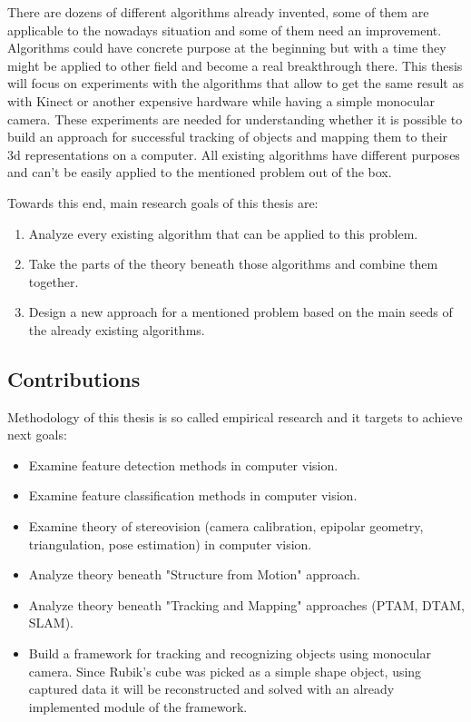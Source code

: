 \documentclass[../main]{subfiles}
\begin{document}
There are dozens of different algorithms already invented, some of them are applicable to the nowadays situation and some of them need an improvement. Algorithms could have concrete purpose at the beginning but with a time they might be applied to other field and become a real breakthrough there. This thesis will focus on experiments with the algorithms that allow to get the same result as with Kinect or another expensive hardware while having a simple monocular camera. These experiments are needed for understanding whether it is possible to build an approach for successful tracking of objects and mapping them to their 3d representations on a computer. All existing algorithms have different purposes and can't be easily applied to the mentioned problem out of the box.

Towards this end, main research goals of this thesis are:
\begin{enumerate}
\item  Analyze every existing algorithm that can be applied to this problem.
\item  Take the parts of the theory beneath those algorithms and combine them together.
\item  Design a new approach for a mentioned problem based on the main seeds of the already existing algorithms. 
\end{enumerate}

\subsection{Contributions}

Methodology of this thesis is so called empirical research and it targets to achieve next goals:

\begin{itemize}
  \item Examine feature detection methods in computer vision.
  \item Examine feature classification methods in computer vision.
  \item Examine theory of stereovision (camera calibration, epipolar geometry, triangulation, pose estimation) in computer vision.
  \item Analyze theory beneath "Structure from Motion" approach.
  \item Analyze theory beneath "Tracking and Mapping" approaches (PTAM, DTAM, SLAM).
  \item Build a framework for tracking and recognizing objects using monocular camera. Since Rubik's cube was picked as a simple shape object, using captured data it will be reconstructed and solved with an already implemented module of the framework.
\end{itemize}
\end{document}
